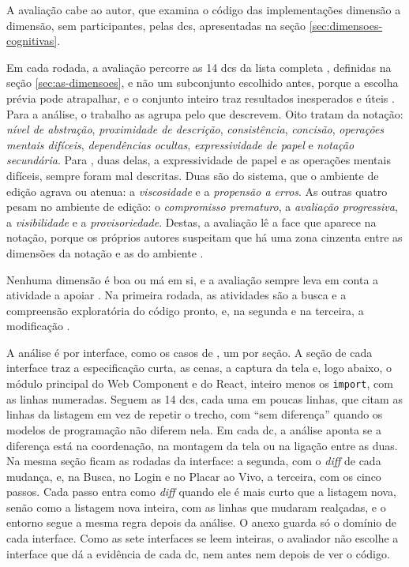 A avaliação cabe ao autor, que examina o código das implementações dimensão
a dimensão, sem participantes, pelas \glspl{dc}, apresentadas na seção
\ref{sec:dimensoes-cognitivas}.

Em cada rodada, a avaliação percorre as 14 \glspl{dc} da lista
completa \cite[p. 115-118]{blackwell2003}, definidas na seção
\ref{sec:as-dimensoes}, e não um subconjunto
escolhido antes, porque a escolha prévia pode atrapalhar, e o conjunto
inteiro traz resultados inesperados e úteis \cite[p. 332]{blackwell2001}.
Para a análise, o trabalho as agrupa pelo que descrevem.
Oito tratam da notação: \emph{nível de abstração}, \emph{proximidade de
descrição}, \emph{consistência}, \emph{concisão}, \emph{operações mentais difíceis},
\emph{dependências ocultas}, \emph{expressividade de papel} e \emph{notação secundária}.
Para \textcite[p. 334]{green2006}, duas delas, a expressividade de
papel e as operações mentais difíceis, sempre foram mal descritas.
Duas são do sistema, que o ambiente de edição agrava ou atenua: a
\emph{viscosidade} e a \emph{propensão a erros}.
As outras quatro pesam no ambiente de edição: o \emph{compromisso
prematuro}, a \emph{avaliação progressiva}, a \emph{visibilidade} e a
\emph{provisoriedade}.
Destas, a avaliação lê a face que aparece na notação, porque os próprios
autores suspeitam que há uma zona cinzenta entre as dimensões da notação e as
do ambiente \cite[p. 357]{green2006}.

Nenhuma dimensão é boa ou má em si, e a avaliação sempre leva em conta a
atividade a apoiar \cite[p. 115]{blackwell2003}.
Na primeira rodada, as atividades são a busca e a compreensão exploratória
do código pronto, e, na segunda e na terceira, a modificação \cite[p. 113]{blackwell2003}.

A análise é por interface, como os casos de
\textcite[p. 17-55]{kiss2014}, um por seção.
A seção de cada interface traz a especificação curta, as cenas, a
captura da tela e, logo abaixo, o módulo principal do Web Component e
do React, inteiro menos os \texttt{import}, com as linhas numeradas.
Seguem as 14 \glspl{dc}, cada uma em poucas linhas, que citam as linhas
da listagem em vez de repetir o trecho, com “sem diferença” quando os
modelos de programação não diferem nela.
Em cada \gls{dc}, a análise aponta se a diferença está na coordenação,
na montagem da tela ou na ligação entre as duas.
Na mesma seção ficam as rodadas da interface: a segunda, com o \emph{diff}
de cada mudança, e, na Busca, no Login e no Placar ao Vivo, a terceira,
com os cinco passos.
Cada passo entra como \emph{diff} quando ele é mais curto que a listagem
nova, senão como a listagem nova inteira, com as linhas que mudaram
realçadas, e o entorno segue a mesma regra depois da análise.
O anexo guarda só o domínio de cada interface.
Como as sete interfaces se leem inteiras, o avaliador não escolhe a
interface que dá a evidência de cada \gls{dc}, nem antes nem depois de
ver o código.

